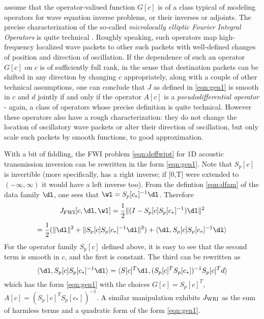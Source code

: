 \cite{StolkSymes:03} assume that the
operator-valiued function $G[c]$ is of a class typical of modeling
operators for wave equation inverse problems, or their inverses or
adjoints. The precise characterization of the so-called {\em microlocally elliptic Fourier Integral
Operators} is quite technical \cite[]{Dui:95}. Roughly speaking, such operators map high-frequency localized wave packets to other
such packets with well-defined changes of position and direction of
oscillation. If the dependence of such an operator $G[c]$ on $c$ is of sufficiently full rank, in
the sense that destination packets can be shifted in any direction by
changing $c$ appropriately, along with a couple of other technical
assumptions, one can conclude that $J$ as defined in \ref{eqn:gen1} is
smooth in $c$ and $d$ jointly if and only if the operator $A[c]$ is a 
{\em pseudodifferential operator} - again, a class of operators whose
precise definition is quite technical. However these operators also
have a rough characterization: they do not change the location of
oscillatory wave packets
or alter their direction of oscillation, but only scale such packets
by smooth functions, to good approximation. 

With a bit of fiddling, the FWI problem \ref{eqn:deffwipt} for 1D 
acoustic transmission inversion can be rewritten in the form \ref{eqn:gen1}. Note
that $S_p[c]$ is invertible (more specifically, has a right inverse; if [0,T] were
extended to $(-\infty,\infty)$ it would have a left inverse too). From
the defintion \ref{eqn:dfam} of the data family $\dl$, one sees that
$\wl = S_p[c_*]^{-1}\dl$. Therefore
\[
  J_{\rm FWI}[c,\dl,\wl] = \frac{1}{2}\|(I-S_p[c]S_p[c_*]^{-1})\dl\|^2
\]
\[
  =\frac{1}{2}(\|\dl\|^2 + \|S_p[c]S_p[c_*]^{-1}\dl\|^2) + \langle \dl,
  S_p[c]S_p[c_*]^{-1}\dl\rangle
\]
For the operator family $S_p[c]$ defined above, it is easy to see that 
the second term is smooth in $c$, and the first is constant. The third 
can be rewritten as 
\[
  \langle \dl,  S_p[c]S_p[c_*]^{-1}\dl\rangle = \langle S[c]^T\dl, 
  (S_p[c]^T S_p[c_*])^{-1}S_p[c]^Td\rangle 
\]
which has the form \ref{eqn:gen1} with the choices $G[c]=S_p[c]^T$,
$A[c]=(S_p[c]^T S_p[c_*])^{-1}$. A similar manipulation exhibits
$J_{\rm WRI}$ as the sum of harmless terms and a quadratic form of the
form \ref{eqn:gen1}.

